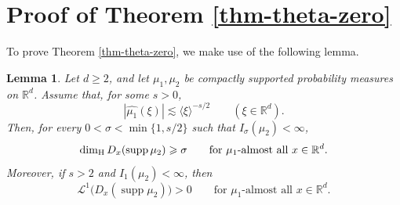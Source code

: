 \documentclass[11pt]{amsart}
\numberwithin{equation}{section}
\renewcommand{\ge}{\geqslant}
\newcommand{\hd}{\dim_{\textup{H}}}
\newtheorem{lemma}[theorem]{Lemma}
\newcommand{\spt}{\operatorname{supp}}
\theoremstyle{plain}
\theoremstyle{remark}
\newcommand{\Rd}{\mathbb{R}^d}
\newcommand{\cL}{\mathcal{L}}
\newcommand{\ang}[1]{\langle #1\rangle}
\begin{document}
\section{Proof of Theorem \ref{thm-theta-zero}} \label{sec:proof2}



To prove Theorem \ref{thm-theta-zero}, we make use of the following lemma.
\begin{lemma}\label{proptheta0}
Let \(d\ge 2\), and let \(\mu_1,\mu_2\) be compactly supported probability
measures on \(\Rd\). Assume that, for some \(s>0\),
\[
|\widehat{\mu_1}(\xi)| \lesssim \ang{\xi}^{-s/2}
\qquad (\xi\in\Rd).
\]
Then, for every \(0<\sigma<\min\{1,s/2\}\) such that \(I_\sigma(\mu_2)<\infty\),
\[
\hd D_x(\spt \mu_2)\ge \sigma
\qquad \text{for $\mu_1$-almost all }x\in\Rd.
\]
Moreover, if \(s>2\) and \(I_1(\mu_2)<\infty\), then
\[
\cL^1\bigl(D_x(\spt \mu_2)\bigr)>0
\qquad \text{for $\mu_1$-almost all }x\in\Rd.
\]
\end{lemma}
\end{document}
